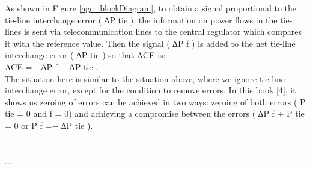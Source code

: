 \documentclass{report}
\begin{document}
As shown in Figure \ref{agc_blockDiagram}, to obtain a signal proportional to the tie-line interchange error ( ∆P tie ), the information on power ﬂows in the tie-lines is sent via telecommunication lines to the central regulator which compares it with the reference value. Then the signal ( ∆P f ) is added to the net tie-line interchange error ( ∆P tie ) so that ACE is: \\

ACE =− ∆P f − ∆P tie .\\

The situation here is similar to the situation above, where we ignore tie-line interchange error, except for the condition to remove errors. In this book [4], it shows us zeroing of errors can be achieved in two ways: zeroing of both errors ( P tie = 0 and f = 0) and achieving a compromise between the errors ( ∆P f + P tie = 0 or P f =− ∆P tie ).\\











\appendix
\chapter{}
...
%
%
\end{document}
